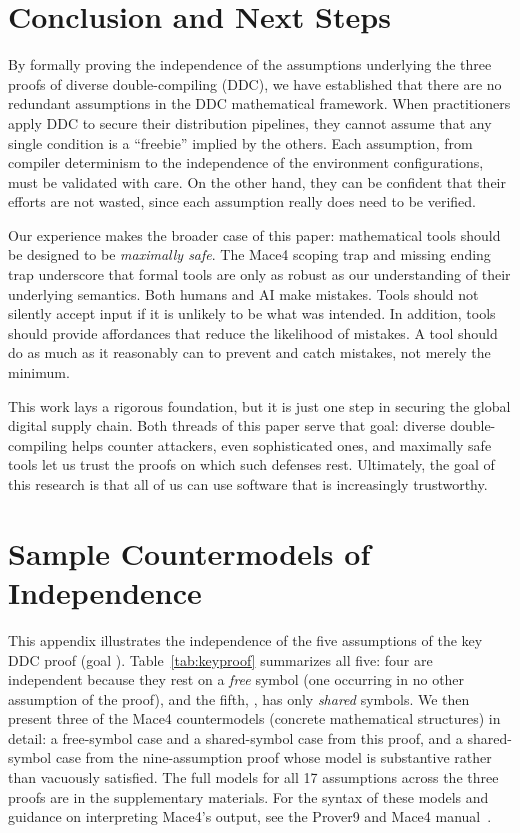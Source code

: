\section{Conclusion and Next Steps}

By formally proving the independence of the assumptions underlying the three proofs of diverse double-compiling (DDC), we have established that there are no redundant assumptions in the DDC mathematical framework. When practitioners apply DDC to secure their distribution pipelines, they cannot assume that any single condition is a ``freebie'' implied by the others. Each assumption, from compiler determinism to the independence of the environment configurations, must be validated with care. On the other hand, they can be confident that their efforts are not wasted, since each assumption really does need to be verified.

Our experience makes the broader case of this paper: mathematical tools should be designed to be \emph{maximally safe}. The Mace4 scoping trap and missing ending trap underscore that formal tools are only as robust as our understanding of their underlying semantics. Both humans and AI make mistakes. Tools should not silently accept input if it is unlikely to be what was intended. In addition, tools should provide affordances that reduce the likelihood of mistakes. A tool should do as much as it reasonably can to prevent and catch mistakes, not merely the minimum.

This work lays a rigorous foundation, but it is just one step in securing the global digital supply chain. Both threads of this paper serve that goal: diverse double-compiling helps counter attackers, even sophisticated ones, and maximally safe tools let us trust the proofs on which such defenses rest. Ultimately, the goal of this research is that all of us can use software that is increasingly trustworthy.

\appendix

\section{Sample Countermodels of Independence}
\label{sec:appendix}

This appendix illustrates the independence of the five assumptions of the key DDC proof (goal ). Table~\ref{tab:keyproof} summarizes all five: four are independent because they rest on a \emph{free} symbol (one occurring in no other assumption of the proof), and the fifth, , has only \emph{shared} symbols. We then present three of the Mace4 countermodels (concrete mathematical structures) in detail: a free-symbol case and a shared-symbol case from this proof, and a shared-symbol case from the nine-assumption  proof whose model is substantive rather than vacuously satisfied. The full models for all 17 assumptions across the three proofs are in the supplementary materials. For the syntax of these models and guidance on interpreting Mace4's output, see the Prover9 and Mace4 manual~\cite{mccune2009prover9}.

